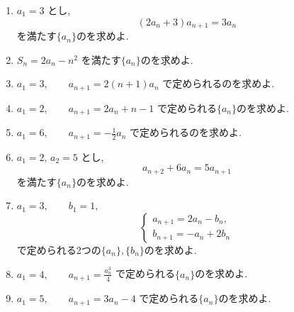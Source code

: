         \begin{enumerate}[label=\textbf{問\arabic*.},leftmargin=3.8em,format=\bookitemlink{practice-basic}{problem}{answer}]
          \item $\displaystyle a_1=3$ とし,
                \[
                  (2a_n+3)a_{n+1}=3a_n
                \]
                を満たす$\{a_n\}$のを求めよ.
          \item $\displaystyle S_n=2a_n-n^2$
                                を満たす$\{a_n\}$のを求めよ.
          \item $\displaystyle a_1=3,\qquad a_{n+1}=2(n+1)a_n$
                で定められるのを求めよ.
          \item $\displaystyle a_1=2,\qquad a_{n+1}=2a_n+n-1$
                で定められる$\{a_n\}$のを求めよ.
          \item $\displaystyle a_1=6,\qquad a_{n+1}=-\frac12a_n$
                で定められるのを求めよ.
          \item $\displaystyle a_1=2,\,a_2=5$ とし,
                \[
                  a_{n+2}+6a_n=5a_{n+1}
                \]
                を満たす$\{a_n\}$のを求めよ.
          \item $\displaystyle a_1=3,\qquad b_1=1,$
                            \[
                              \begin{cases}
                                a_{n+1}=2a_n-b_n,\\
                                b_{n+1}=-a_n+2b_n
                              \end{cases}
                            \]
                                で定められる2つの$\{a_n\},\{b_n\}$のを求めよ.
          \item $\displaystyle a_1=4,\qquad a_{n+1}=\frac{a_n^3}{4}$
                で定められる$\{a_n\}$のを求めよ.
          \item $\displaystyle a_1=5,\qquad a_{n+1}=3a_n-4$
                で定められる$\{a_n\}$のを求めよ.

\end{enumerate}
